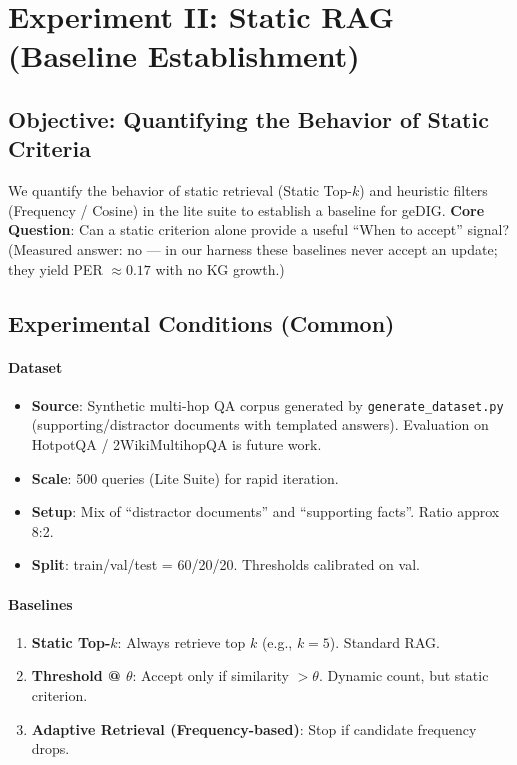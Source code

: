 \documentclass[12pt]{article}
\begin{document}
\section{Experiment II: Static RAG (Baseline Establishment)}
\label{sec:rag_experiment}

\subsection{Objective: Quantifying the Behavior of Static Criteria}
We quantify the behavior of static retrieval (Static Top-$k$) and heuristic filters (Frequency / Cosine) in the lite suite to establish a baseline for geDIG.
\textbf{Core Question}: Can a static criterion alone provide a useful ``When to accept'' signal?
(Measured answer: no --- in our harness these baselines never accept an update; they yield PER $\approx 0.17$ with no KG growth.)

\subsection{Experimental Conditions (Common)}
\paragraph{Dataset}\;
\begin{itemize}
    \item \textbf{Source}: Synthetic multi-hop QA corpus generated by \texttt{generate\_dataset.py} (supporting/distractor documents with templated answers). Evaluation on HotpotQA / 2WikiMultihopQA is future work.
    \item \textbf{Scale}: 500 queries (Lite Suite) for rapid iteration.
    \item \textbf{Setup}: Mix of ``distractor documents'' and ``supporting facts''. Ratio approx 8:2.
    \item \textbf{Split}: train/val/test = 60/20/20. Thresholds calibrated on val.
\end{itemize}

\paragraph{Baselines}\;
\begin{enumerate}
    \item \textbf{Static Top-$k$}: Always retrieve top $k$ (e.g., $k=5$). Standard RAG.
    \item \textbf{Threshold @ $\theta$}: Accept only if similarity $>\theta$. Dynamic count, but static criterion.
    \item \textbf{Adaptive Retrieval (Frequency-based)}: Stop if candidate frequency drops.
\end{enumerate}
\end{document}
